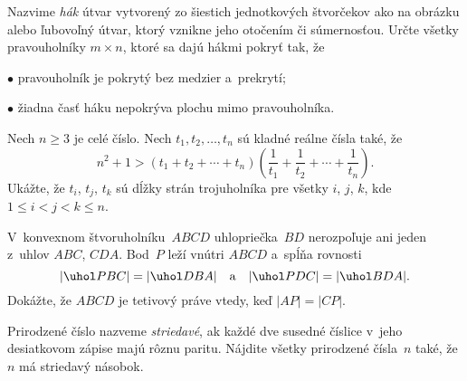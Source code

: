 {%
Nazvime {\it hák\/} útvar vytvorený zo
šiestich jednotkových štvorčekov ako na obrázku
alebo ľubovoľný útvar, ktorý vznikne jeho otočením či súmernosťou.
Určte všetky pravouholníky $m\times n$, ktoré sa dajú hákmi
pokryť tak, že
\item{$\bullet$}
   pravouholník je pokrytý bez medzier a~prekrytí;
\item{$\bullet$}
   žiadna časť háku nepokrýva plochu mimo pravouholníka.
   }

{%
Nech ${n\ge 3}$ je celé číslo. Nech
$t_1,t_2,\dots,t_n$ sú kladné reálne čísla také, že
$$
n^2+1>(t_1+t_2+\cdots+t_n)\left(\frac{1}{t_1}+\frac{1}{t_2}+\cdots+\frac{1}{t_n}\right).
$$
Ukážte, že $t_i$, $t_j$, $t_k$ sú dĺžky strán trojuholníka
pre všetky $i$, $j$, $k$, kde $1\le i<j<k\le n$.}

{%
V~konvexnom štvoruholníku~$ABCD$
uhlopriečka~$BD$ nerozpoľuje ani jeden z~uhlov $ABC$, $CDA$.
Bod~$P$ leží vnútri $ABCD$ a~spĺňa rovnosti
$$
|\uhol PBC|=|\uhol DBA|\quad\text{a}\quad |\uhol PDC|=|\uhol BDA|.
$$
Dokážte, že $ABCD$ je tetivový práve vtedy, keď $|AP|=|CP|$.}

{%
Prirodzené číslo nazveme {\it striedavé}, ak každé dve
susedné číslice v~jeho desiatkovom zápise majú rôznu paritu.
Nájdite všetky prirodzené čísla~$n$ také, že $n$ má striedavý
násobok.}

